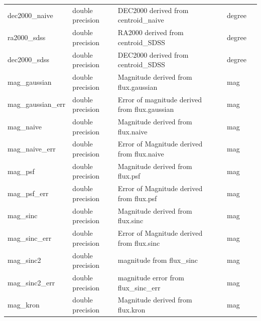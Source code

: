 \documentclass[12pt]{article}
\begin{document}
\begin{table}[thbp]
\begin{center}
{\begin{tabular}{llllll}
dec2000\_naive & double precision & DEC2000 derived from centroid\_naive                      &                           & degree           &             \\
ra2000\_sdss & double precision & RA2000 derived from centroid\_SDSS                        &                           & degree           &             \\
dec2000\_sdss & double precision & DEC2000 derived from centroid\_SDSS                       &                           & degree           &             \\
mag\_gaussian & double precision & Magnitude derived from flux.gaussian                     &                           & mag              &             \\
mag\_gaussian\_err & double precision & Error of magnitude derived from flux.gaussian            &                           & mag              &             \\
mag\_naive & double precision & Magnitude derived from flux.naive                        &                           & mag              &             \\
mag\_naive\_err & double precision & Error of Magnitude derived from flux.naive               &                           & mag              &             \\
mag\_psf & double precision & Magnitude derived from flux.psf                          &                           & mag              &             \\
mag\_psf\_err & double precision & Error of Magnitude derived from flux.psf                 &                           & mag              &             \\
mag\_sinc & double precision & Magnitude derived from flux.sinc                         &                           & mag              &             \\
mag\_sinc\_err & double precision & Error of Magnitude derived from flux.sinc                &                           & mag              &             \\
mag\_sinc2 & double precision & magnitude from flux\_sinc                            &                            & mag         &   \\
mag\_sinc2\_err & double precision & magnitude error from flux\_sinc\_err                    &                            & mag         &   \\
mag\_kron & double precision & Magnitude derived from flux.kron                         &                           & mag              &             \\

\end{tabular}}
\end{center}
\end{table}
\end{document}
